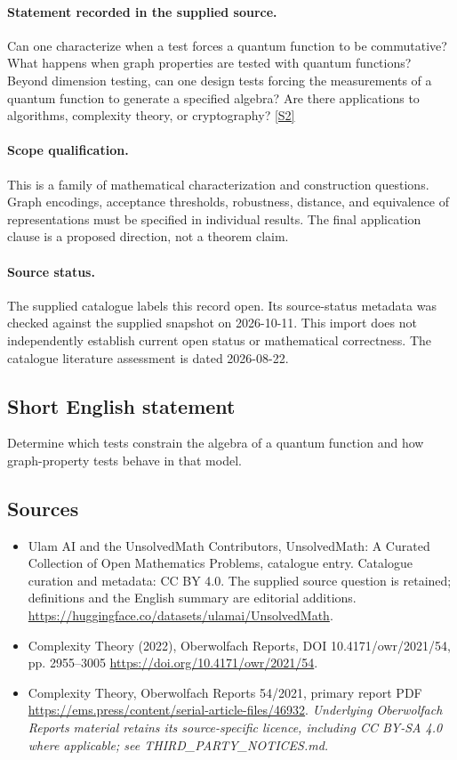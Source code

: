 \documentclass[11pt]{article}
\begin{document}
\paragraph{Statement recorded in the supplied source.}
Can one characterize when a test forces a quantum function to be commutative? What happens when graph properties are tested with quantum functions? Beyond dimension testing, can one design tests forcing the measurements of a quantum function to generate a specified algebra? Are there applications to algorithms, complexity theory, or cryptography? \href{https://doi.org/10.4171/owr/2021/54}{[S2]}
\paragraph{Scope qualification.}
This is a family of mathematical characterization and construction questions. Graph encodings, acceptance thresholds, robustness, distance, and equivalence of representations must be specified in individual results. The final application clause is a proposed direction, not a theorem claim.
\paragraph{Source status.}
The supplied catalogue labels this record open. Its source-status metadata was checked against the supplied snapshot on 2026-10-11. This import does not independently establish current open status or mathematical correctness. The catalogue literature assessment is dated 2026-08-22.
\subsection{Short English statement}
Determine which tests constrain the algebra of a quantum function and how graph-property tests behave in that model.
\subsection{Sources}
\begin{itemize}
\item[S1] Ulam AI and the UnsolvedMath Contributors, UnsolvedMath: A Curated Collection of Open Mathematics Problems, catalogue entry. Catalogue curation and metadata: CC BY 4.0. The supplied source question is retained; definitions and the English summary are editorial additions.
\url{https://huggingface.co/datasets/ulamai/UnsolvedMath}.
\item[S2] Complexity Theory (2022), Oberwolfach Reports, DOI 10.4171/owr/2021/54, pp. 2955--3005
\url{https://doi.org/10.4171/owr/2021/54}.
\item[S3] Complexity Theory, Oberwolfach Reports 54/2021, primary report PDF
\url{https://ems.press/content/serial-article-files/46932}.
\textit{Underlying Oberwolfach Reports material retains its source-specific licence, including CC BY-SA 4.0 where applicable; see THIRD\_PARTY\_NOTICES.md.}
\end{itemize}
\end{document}
